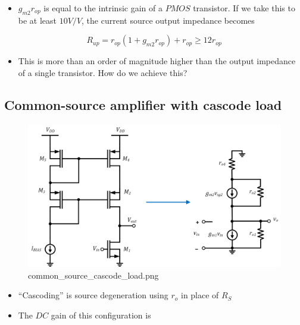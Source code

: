 \documentclass[11pt]{article}
\providecommand{\tightlist}{%
      \setlength{\itemsep}{0pt}\setlength{\parskip}{0pt}}
\begin{document}
\begin{itemize}
\tightlist
\item
  \(g_{m2} r_{op}\) is equal to the intrinsic gain of a \(PMOS\)
  transistor. If we take this to be at least \(10V/V\), the current
  source output impedance becomes
\end{itemize}

\begin{equation}
R_{up} = r_{op}(1+g_{m2} r_{op}) + r_{op} \geq 12 r_{op}
\end{equation}

\begin{itemize}
\tightlist
\item
  This is more than an order of magnitude higher than the output
  impedance of a single transistor. How do we achieve this?
\end{itemize}

    \hypertarget{common-source-amplifier-with-cascode-load}{%
\subsection{Common-source amplifier with cascode
load}\label{common-source-amplifier-with-cascode-load}}

    \begin{figure}
\centering
\includegraphics{common_source_cascode_load.png}
\caption{common\_source\_cascode\_load.png}
\end{figure}

    \begin{itemize}
\tightlist
\item
  ``Cascoding'' is source degeneration using \(r_o\) in place of \(R_S\)
\item
  The \(DC\) gain of this configuration is
\end{itemize}
\end{document}
